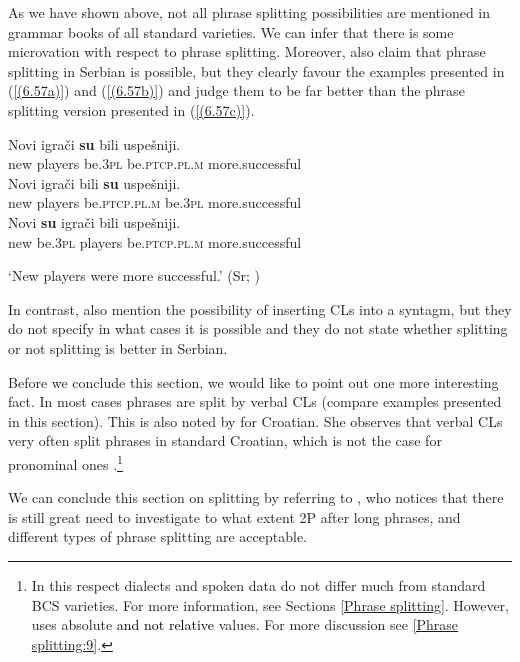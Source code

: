 \noindent As we have shown above, not all phrase splitting possibilities are mentioned in grammar books of all standard varieties. We can infer that there is some microvation with respect to phrase splitting. Moreover, \citet[][105]{PiperIvic05} also claim that phrase splitting in Serbian is possible, but they clearly favour the examples presented in (\ref{(6.57a)}) and (\ref{(6.57b)}) and judge them to be far better than the phrase splitting version presented in (\ref{(6.57c)}). 


\begin{exe}\ex\begin{xlist}\ex\label{(6.57a)}
\gll Novi igrači \textbf{su} bili uspešniji.\\
 new players be\textsc{.3pl} be\textsc{.ptcp.pl.m} more.successful\\
\ex\label{(6.57b)}
\gll Novi igrači bili \textbf{su} uspešniji.\\
 new players be\textsc{.ptcp.pl.m} be\textsc{.3pl} more.successful\\
\ex\label{(6.57c)}
\gll Novi \textbf{su} igrači bili uspešniji.\\
 new be\textsc{.3pl} players be\textsc{.ptcp.pl.m} more.successful\\
\end{xlist}
\glt‘New players were more successful.’ 
\hfill (Sr; \citealt[105]{PiperIvic05})
\end{exe}

\noindent In contrast, \citet[371]{StanojcicPopovic02} also mention the possibility of inserting CLs into a syntagm, but they do not specify in what cases it is possible and they do not state whether splitting or not splitting is better in Serbian. 

Before we conclude this section, we would like to point out one more interesting fact. In most cases phrases are split by verbal CLs (compare examples presented in this section). This is also noted by \citet{PetiStantic02} for Croatian. She observes that verbal CLs very often split phrases in standard Croatian, which is not the case for pronominal ones \citep[cf.][174f]{PetiStantic02}.\footnote{In this respect dialects and spoken data do not differ much from standard BCS varieties. For more information, see Sections \ref{Phrase splitting}. However, \citet{PetiStantic02} uses absolute \textcolor{black}{and not relative} values. For more discussion see \ref{Phrase splitting:9}.}

We can conclude this section on splitting by referring to \citet[50]{Alexander09}, who notices that there is still great need to investigate to what extent 2P after long phrases, and different types of phrase splitting are acceptable. 

